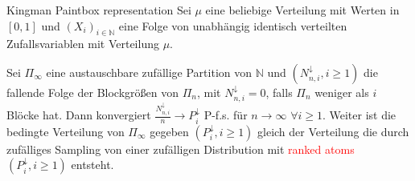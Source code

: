 \begin{section}{Kingman Paintbox representation}
Sei $\mu$ eine beliebige Verteilung mit Werten in $[0,1]$ und $(X_i)_{i \in \mathbb{N}}$ eine Folge von unabhängig identisch verteilten Zufallsvariablen mit Verteilung $\mu$.
\begin{theorem}
    Sei $\Pi_\infty$ eine austauschbare zufällige Partition von $\mathbb{N}$ und $(N^{\downarrow}_{n,i}, i \geq 1)$ die fallende Folge der Blockgrößen von $\Pi_n$, mit $N_{n,i}^\downarrow = 0$, falls $\Pi_n$ weniger als $i$ Blöcke hat. Dann konvergiert $\frac{N_{n,i}^\downarrow}{n} \rightarrow P^\downarrow_i$ P-f.s. für $n \to \infty$ $ \forall i \geq 1$. Weiter ist die bedingte Verteilung von $\Pi_\infty$ gegeben $(P_i^\downarrow, i \geq 1)$ gleich der Verteilung die durch zufälliges Sampling von einer zufälligen Distribution mit \textcolor{red}{ranked atoms} $(P^\downarrow_i, i \geq 1)$ entsteht.
\end{theorem}
\end{section}